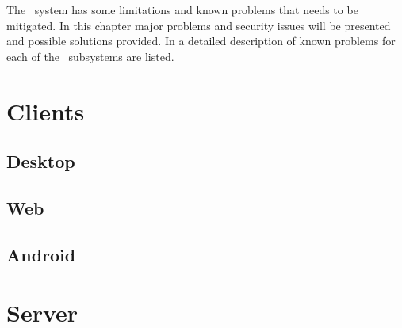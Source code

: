 The \appName\ system has some limitations and known problems that needs to be
mitigated. In this chapter major problems and security issues will be presented
and possible solutions provided. In  a detailed
description of known problems for each of the \appName\ subsystems are listed.

\section{Clients}
\subsection{Desktop}
\FloatBarrier
\subsection{Web}

\FloatBarrier
\subsection{Android}
\section{Server}



